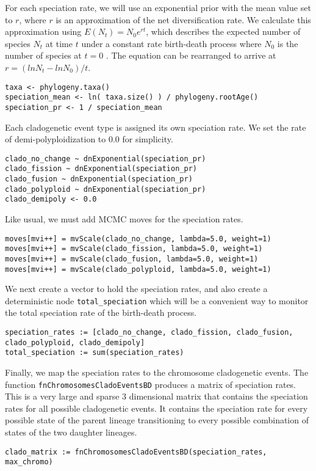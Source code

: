 For each speciation rate, we will use an exponential prior
with the mean value set to $r$, where $r$ is an approximation
of the net diversification rate.
We calculate this approximation using $E(N_t) = N_0 e^{rt}$,
which describes the expected number of species $N_t$ 
at time $t$ under a constant rate birth-death process
where $N_0$ is the number of species at $t=0$ \citep{nee94}. 
The equation can be rearranged to arrive at
$r = ( ln N_t - ln N_0 ) / t$.
{\tt \begin{snugshade*}
\begin{lstlisting}
taxa <- phylogeny.taxa()
speciation_mean <- ln( taxa.size() ) / phylogeny.rootAge()
speciation_pr <- 1 / speciation_mean
\end{lstlisting}
\end{snugshade*}
}
Each cladogenetic event type is assigned its own speciation rate.
We set the rate of demi-polyploidization to 0.0 for simplicity.
{\tt \begin{snugshade*}
\begin{lstlisting}
clado_no_change ~ dnExponential(speciation_pr)
clado_fission ~ dnExponential(speciation_pr)
clado_fusion ~ dnExponential(speciation_pr)
clado_polyploid ~ dnExponential(speciation_pr)
clado_demipoly <- 0.0
\end{lstlisting}
\end{snugshade*}
}
Like usual, we must add MCMC moves for the speciation rates.
{\tt \begin{snugshade*}
\begin{lstlisting}
moves[mvi++] = mvScale(clado_no_change, lambda=5.0, weight=1)
moves[mvi++] = mvScale(clado_fission, lambda=5.0, weight=1)
moves[mvi++] = mvScale(clado_fusion, lambda=5.0, weight=1)
moves[mvi++] = mvScale(clado_polyploid, lambda=5.0, weight=1)
\end{lstlisting}
\end{snugshade*}
}
We next create a vector to hold the speciation rates,
and also create a deterministic node \texttt{total\_speciation}
which will be a convenient way to monitor the total speciation rate
of the birth-death process.
{\tt \begin{snugshade*}
\begin{lstlisting}
speciation_rates := [clado_no_change, clado_fission, clado_fusion, clado_polyploid, clado_demipoly]
total_speciation := sum(speciation_rates)
\end{lstlisting}
\end{snugshade*}
}
Finally, we map the speciation rates to the chromosome cladogenetic events.
The function \texttt{fnChromosomesCladoEventsBD}
produces a matrix of speciation rates. This is a very
large and sparse 3 dimensional matrix that contains the speciation rates 
for all possible cladogenetic events.
It contains the speciation rate for
every possible state of the parent lineage transitioning to every possible
combination of states of the two daughter lineages.
{\tt \begin{snugshade*}
\begin{lstlisting}
clado_matrix := fnChromosomesCladoEventsBD(speciation_rates, max_chromo)
\end{lstlisting}
\end{snugshade*}
}

